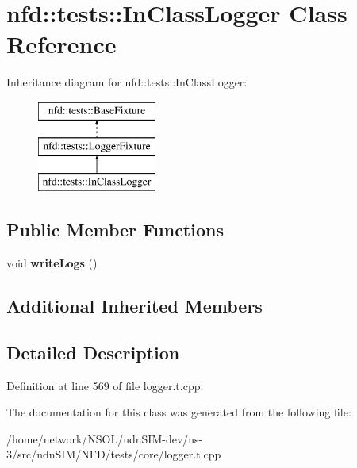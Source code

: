 \hypertarget{classnfd_1_1tests_1_1InClassLogger}{}\section{nfd\+:\+:tests\+:\+:In\+Class\+Logger Class Reference}
\label{classnfd_1_1tests_1_1InClassLogger}
Inheritance diagram for nfd\+:\+:tests\+:\+:In\+Class\+Logger\+:\begin{figure}[H]
\begin{center}
\leavevmode
\includegraphics[height=3.000000cm]{classnfd_1_1tests_1_1InClassLogger}
\end{center}
\end{figure}
\subsection*{Public Member Functions}
\begin{DoxyCompactItemize}
\item 
void {\bfseries write\+Logs} ()\hypertarget{classnfd_1_1tests_1_1InClassLogger_a3f2b90db0a39bd91806d92fdb2a9f3c5}{}\label{classnfd_1_1tests_1_1InClassLogger_a3f2b90db0a39bd91806d92fdb2a9f3c5}

\end{DoxyCompactItemize}
\subsection*{Additional Inherited Members}


\subsection{Detailed Description}


Definition at line 569 of file logger.\+t.\+cpp.



The documentation for this class was generated from the following file\+:\begin{DoxyCompactItemize}
\item 
/home/network/\+N\+S\+O\+L/ndn\+S\+I\+M-\/dev/ns-\/3/src/ndn\+S\+I\+M/\+N\+F\+D/tests/core/logger.\+t.\+cpp\end{DoxyCompactItemize}
